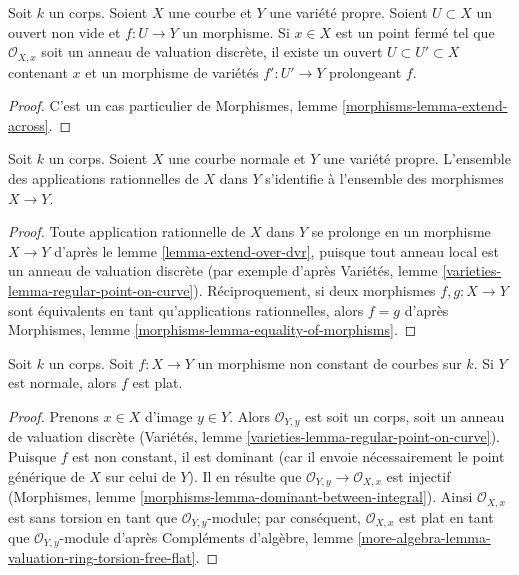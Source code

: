 \begin{lemma}
\label{lemma-extend-over-dvr}
Soit $k$ un corps. Soient $X$ une courbe et $Y$ une variété propre. Soient $U \subset X$ un ouvert non vide et $f : U \to Y$ un morphisme. Si $x \in X$ est un point fermé tel que $\mathcal{O}_{X, x}$ soit un anneau de valuation discrète, il existe un ouvert $U \subset U' \subset X$ contenant $x$ et un morphisme de variétés $f' : U' \to Y$ prolongeant $f$.
\end{lemma}

\begin{proof}
C'est un cas particulier de Morphismes, lemme \ref{morphisms-lemma-extend-across}.
\end{proof}

\begin{lemma}
\label{lemma-extend-over-normal-curve}
Soit $k$ un corps. Soient $X$ une courbe normale et $Y$ une variété propre. L'ensemble des applications rationnelles de $X$ dans $Y$ s'identifie à l'ensemble des morphismes $X \to Y$.
\end{lemma}

\begin{proof}
Toute application rationnelle de $X$ dans $Y$ se prolonge en un morphisme $X \to Y$ d'après le lemme \ref{lemma-extend-over-dvr}, puisque tout anneau local est un anneau de valuation discrète (par exemple d'après Variétés, lemme \ref{varieties-lemma-regular-point-on-curve}). Réciproquement, si deux morphismes $f,g: X \to Y$ sont équivalents en tant qu'applications rationnelles, alors $f = g$ d'après Morphismes, lemme \ref{morphisms-lemma-equality-of-morphisms}.
\end{proof}

\begin{lemma}
\label{lemma-flat}
Soit $k$ un corps. Soit $f : X \to Y$ un morphisme non constant de courbes sur $k$. Si $Y$ est normale, alors $f$ est plat.
\end{lemma}

\begin{proof}
Prenons $x \in X$ d'image $y \in Y$. Alors $\mathcal{O}_{Y, y}$ est soit un corps, soit un anneau de valuation discrète (Variétés, lemme \ref{varieties-lemma-regular-point-on-curve}). Puisque $f$ est non constant, il est dominant (car il envoie nécessairement le point générique de $X$ sur celui de $Y$). Il en résulte que $\mathcal{O}_{Y, y} \to \mathcal{O}_{X, x}$ est injectif (Morphismes, lemme \ref{morphisms-lemma-dominant-between-integral}). Ainsi $\mathcal{O}_{X, x}$ est sans torsion en tant que $\mathcal{O}_{Y, y}$-module; par conséquent, $\mathcal{O}_{X, x}$ est plat en tant que $\mathcal{O}_{Y, y}$-module d'après Compléments d'algèbre, lemme \ref{more-algebra-lemma-valuation-ring-torsion-free-flat}.
\end{proof}

